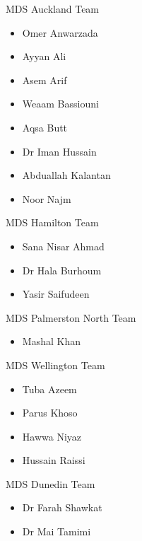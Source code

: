 \documentclass[
  ignorenonframetext,
  aspectratio=169,
]{beamer}
\providecommand{\tightlist}{%
  \setlength{\itemsep}{0pt}\setlength{\parskip}{0pt}}\usepackage{longtable,booktabs,array}
\begin{document}
\begin{frame}{MDS Auckland Team}
\label{mds-auckland-team}
\begin{itemize}
\tightlist
\item
  Omer Anwarzada
\item
  Ayyan Ali
\item
  Asem Arif
\item
  Weaam Bassiouni
\item
  Aqsa Butt
\item
  Dr Iman Hussain
\item
  Abduallah Kalantan
\item
  Noor Najm
\end{itemize}
\end{frame}

\begin{frame}{MDS Hamilton Team}
\label{mds-hamilton-team}
\begin{itemize}
\tightlist
\item
  Sana Nisar Ahmad
\item
  Dr Hala Burhoum
\item
  Yasir Saifudeen
\end{itemize}
\end{frame}

\begin{frame}{MDS Palmerston North Team}
\label{mds-palmerston-north-team}
\begin{itemize}
\tightlist
\item
  Mashal Khan
\end{itemize}
\end{frame}

\begin{frame}{MDS Wellington Team}
\label{mds-wellington-team}
\begin{itemize}
\tightlist
\item
  Tuba Azeem
\item
  Parus Khoso
\item
  Hawwa Niyaz
\item
  Hussain Raissi
\end{itemize}
\end{frame}

\begin{frame}{MDS Dunedin Team}
\label{mds-dunedin-team}
\begin{itemize}
\tightlist
\item
  Dr Farah Shawkat
\item
  Dr Mai Tamimi
\end{itemize}
\end{frame}
\end{document}
